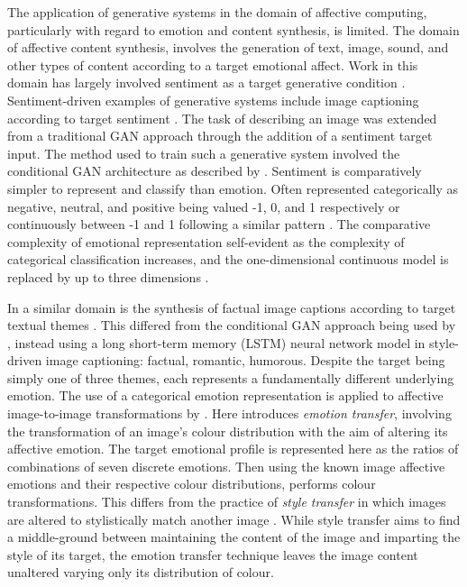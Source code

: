 \documentclass{article}
\begin{document}
The application of generative systems in the domain of affective computing, particularly with regard to emotion and content synthesis, is limited.
The domain of affective content synthesis, involves the generation of text, image, sound, and other types of content according to a target emotional affect.
Work in this domain has largely involved sentiment as a target generative condition \citep{cambria2016affective,gunes2011emotion,mathews2016senticap}.
Sentiment-driven examples of generative systems include image captioning according to target sentiment \citep{mathews2016senticap}.
The task of describing an image was extended from a traditional GAN approach through the addition of a sentiment target input.
The method used to train such a generative system involved the conditional GAN architecture as described by \citet{gauthier2014conditional}.
Sentiment is comparatively simpler to represent and classify than emotion.
Often represented categorically as negative, neutral, and positive being valued -1, 0, and 1 respectively or continuously between -1 and 1 following a similar pattern \citep{mathews2016senticap,gunes2011emotion,zhao2016predicting}.
The comparative complexity of emotional representation self-evident as the complexity of categorical classification increases, and the one-dimensional continuous model is replaced by up to three dimensions \citep{zhao2016predicting}.

In a similar domain is the synthesis of factual image captions according to target textual themes \citep{gan2017stylenet}.
This differed from the conditional GAN approach being used by \citet{mathews2016senticap}, instead using a long short-term memory (LSTM) neural network model in style-driven image captioning: factual, romantic, humorous.
Despite the target being simply one of three themes, each represents a fundamentally different underlying emotion.
The use of a categorical emotion representation is applied to affective image-to-image transformations by \citet{ali2017emotional}.
Here \citet{ali2017emotional} introduces \textit{emotion transfer}, involving the transformation of an image's colour distribution with the aim of altering its affective emotion.
The target emotional profile is represented here as the ratios of combinations of seven discrete emotions.
Then using the known image affective emotions and their respective colour distributions, performs colour transformations.
This differs from the practice of \textit{style transfer} in which images are altered to stylistically match another image \citep{gatys2016image}.
While style transfer aims to find a middle-ground between maintaining the content of the image and imparting the style of its target, the emotion transfer technique leaves the image content unaltered varying only its distribution of colour.
\end{document}
